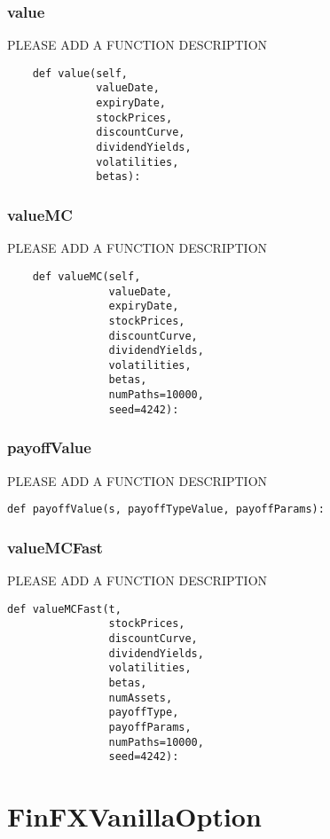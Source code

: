 \documentclass[twoside,11pt]{book}
\begin{document}
\subsubsection*{{\bf value}}
PLEASE ADD A FUNCTION DESCRIPTION

\begin{lstlisting}
    def value(self,
              valueDate,
              expiryDate,
              stockPrices,
              discountCurve,
              dividendYields,
              volatilities,
              betas):
\end{lstlisting}

\subsubsection*{{\bf valueMC}}
PLEASE ADD A FUNCTION DESCRIPTION

\begin{lstlisting}
    def valueMC(self,
                valueDate,
                expiryDate,
                stockPrices,
                discountCurve,
                dividendYields,
                volatilities,
                betas,
                numPaths=10000,
                seed=4242):
\end{lstlisting}

\subsubsection*{{\bf payoffValue}}
PLEASE ADD A FUNCTION DESCRIPTION

\begin{lstlisting}
def payoffValue(s, payoffTypeValue, payoffParams):
\end{lstlisting}

\subsubsection*{{\bf valueMCFast}}
PLEASE ADD A FUNCTION DESCRIPTION

\begin{lstlisting}
def valueMCFast(t,
                stockPrices,
                discountCurve,
                dividendYields,
                volatilities,
                betas,
                numAssets,
                payoffType,
                payoffParams,
                numPaths=10000,
                seed=4242):
\end{lstlisting}

\newpage
\section{FinFXVanillaOption}
\end{document}
